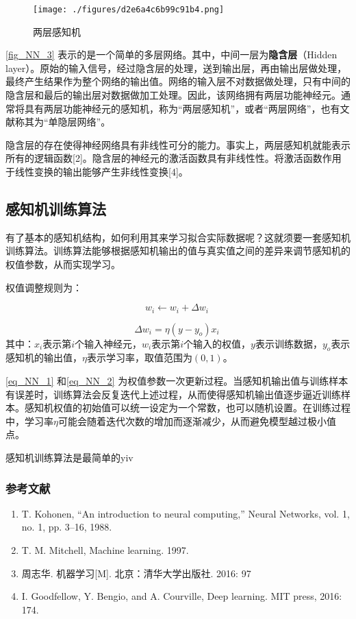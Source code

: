 \begin{figure}[ht]
\centering
\texttt{[image: ./figures/d2e6a4c6b99c91b4.png]}
\caption{两层感知机} \label{fig_NN_3}
\end{figure}
\autoref{fig_NN_3} 表示的是一个简单的多层网络。其中，中间一层为\textbf{隐含层}（Hidden layer）。原始的输入信号，经过隐含层的处理，送到输出层，再由输出层做处理，最终产生结果作为整个网络的输出值。网络的输入层不对数据做处理，只有中间的隐含层和最后的输出层对数据做加工处理。因此，该网络拥有两层功能神经元。通常将具有两层功能神经元的感知机，称为“两层感知机”，或者“两层网络”，也有文献称其为“单隐层网络”。

隐含层的存在使得神经网络具有非线性可分的能力。事实上，两层感知机就能表示所有的逻辑函数[2]。隐含层的神经元的激活函数具有非线性性。将激活函数作用于线性变换的输出能够产生非线性变换[4]。

\subsection{感知机训练算法}

有了基本的感知机结构，如何利用其来学习拟合实际数据呢？这就须要一套感知机训练算法。训练算法能够根据感知机输出的值与真实值之间的差异来调节感知机的权值参数，从而实现学习。

权值调整规则为：

\begin{equation}\label{eq_NN_1}
w_i \leftarrow w_i + \Delta w_i~
\end{equation}

\begin{equation}\label{eq_NN_2}
\Delta w_i = \eta(y-y_o)x_i~
\end{equation}
其中：$x_i$表示第$i$个输入神经元，$w_i$表示第$i$个输入的权值，$y$表示训练数据，$y_o$表示感知机的输出值，$\eta$表示学习率，取值范围为$(0,1)$。

\autoref{eq_NN_1} 和\autoref{eq_NN_2} 为权值参数一次更新过程。当感知机输出值与训练样本有误差时，训练算法会反复迭代上述过程，从而使得感知机输出值逐步逼近训练样本。感知机权值的初始值可以统一设定为一个常数，也可以随机设置。在训练过程中，学习率$\eta$可能会随着迭代次数的增加而逐渐减少，从而避免模型越过极小值点。

感知机训练算法是最简单的yiv




\subsubsection{参考文献}
\begin{enumerate}
\item T. Kohonen, “An introduction to neural computing,” Neural Networks, vol. 1, no. 1, pp. 3–16, 1988.
\item T. M. Mitchell, Machine learning. 1997.
\item 周志华. 机器学习[M]. 北京：清华大学出版社. 2016: 97
\item I. Goodfellow, Y. Bengio, and A. Courville, Deep learning. MIT press, 2016: 174.
\end{enumerate}